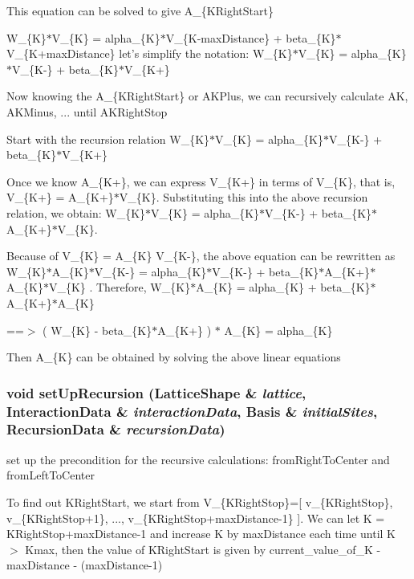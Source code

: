 This equation can be solved to give A\_\-\{KRight\-Start\}

W\_\-\{K\}$\ast$V\_\-\{K\} = alpha\_\-\{K\}$\ast$V\_\-\{K-max\-Distance\} + beta\_\-\{K\}$\ast$V\_\-\{K+max\-Distance\} let's simplify the notation: W\_\-\{K\}$\ast$V\_\-\{K\} = alpha\_\-\{K\}$\ast$V\_\-\{K-\} + beta\_\-\{K\}$\ast$V\_\-\{K+\}

Now knowing the A\_\-\{KRight\-Start\} or AKPlus, we can recursively calculate AK, AKMinus, ... until AKRight\-Stop

Start with the recursion relation W\_\-\{K\}$\ast$V\_\-\{K\} = alpha\_\-\{K\}$\ast$V\_\-\{K-\} + beta\_\-\{K\}$\ast$V\_\-\{K+\}

Once we know A\_\-\{K+\}, we can express V\_\-\{K+\} in terms of V\_\-\{K\}, that is, V\_\-\{K+\} = A\_\-\{K+\}$\ast$V\_\-\{K\}. Substituting this into the above recursion relation, we obtain: W\_\-\{K\}$\ast$V\_\-\{K\} = alpha\_\-\{K\}$\ast$V\_\-\{K-\} + beta\_\-\{K\}$\ast$A\_\-\{K+\}$\ast$V\_\-\{K\}.

Because of V\_\-\{K\} = A\_\-\{K\} V\_\-\{K-\}, the above equation can be rewritten as W\_\-\{K\}$\ast$A\_\-\{K\}$\ast$V\_\-\{K-\} = alpha\_\-\{K\}$\ast$V\_\-\{K-\} + beta\_\-\{K\}$\ast$A\_\-\{K+\}$\ast$A\_\-\{K\}$\ast$V\_\-\{K\} . Therefore, W\_\-\{K\}$\ast$A\_\-\{K\} = alpha\_\-\{K\} + beta\_\-\{K\}$\ast$A\_\-\{K+\}$\ast$A\_\-\{K\}

==$>$ ( W\_\-\{K\} - beta\_\-\{K\}$\ast$A\_\-\{K+\} ) $\ast$ A\_\-\{K\} = alpha\_\-\{K\}

Then A\_\-\{K\} can be obtained by solving the above linear equations 
\subsubsection{\setlength{\rightskip}{0pt plus 5cm}void set\-Up\-Recursion (\bf{Lattice\-Shape} \& {\em lattice}, \bf{Interaction\-Data} \& {\em interaction\-Data}, \bf{Basis} \& {\em initial\-Sites}, \bf{Recursion\-Data} \& {\em recursion\-Data})}\label{recursiveCalculation_8cpp_d26ca3ee87a9f745d2593ca8e8f089d0}


set up the precondition for the recursive calculations: from\-Right\-To\-Center and from\-Left\-To\-Center 

To find out KRight\-Start, we start from V\_\-\{KRight\-Stop\}=[ v\_\-\{KRight\-Stop\}, v\_\-\{KRight\-Stop+1\}, ..., v\_\-\{KRight\-Stop+max\-Distance-1\} ]. We can let K = KRight\-Stop+max\-Distance-1 and increase K by max\-Distance each time until K $>$ Kmax, then the value of KRight\-Start is given by current\_\-value\_\-of\_\-K - max\-Distance - (max\-Distance-1) 
